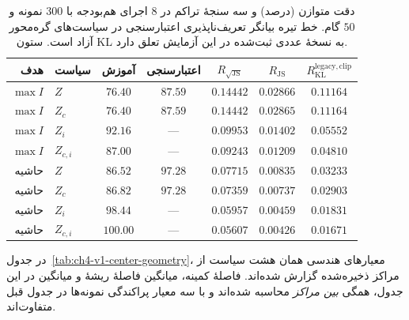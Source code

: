 \begin{table}[htbp]
\centering\footnotesize
\caption{دقت متوازن (درصد) و سه سنجهٔ تراکم در $8$ اجرای هم‌بودجه با $300$ نمونه و $50$ گام. خط تیره بیانگر تعریف‌ناپذیری اعتبارسنجی در سیاست‌های گره‌محور آزاد است. ستون KL به نسخهٔ عددی ثبت‌شده در این آزمایش تعلق دارد.}
\label{tab:ch4-v1-I-margin-main}
\begin{tabular}{rlccccc}\hline
هدف & سیاست & آموزش & اعتبارسنجی & $R_{\sqrt{\mathrm{JS}}}$ & $R_{\mathrm{JS}}$ & $R_{\mathrm{KL}}^{\mathrm{legacy,clip}}$\\\hline
$\max I$ & $Z$ & $76.40$ & $87.59$ & $0.14442$ & $0.02866$ & $0.11164$\\
$\max I$ & $Z_c$ & $76.40$ & $87.59$ & $0.14442$ & $0.02865$ & $0.11164$\\
$\max I$ & $Z_i$ & $92.16$ & --- & $0.09953$ & $0.01402$ & $0.05552$\\
$\max I$ & $Z_{c,i}$ & $87.00$ & --- & $0.09243$ & $0.01209$ & $0.04810$\\
حاشیه & $Z$ & $86.52$ & $97.28$ & $0.07715$ & $0.00835$ & $0.03233$\\
حاشیه & $Z_c$ & $86.82$ & $97.28$ & $0.07359$ & $0.00737$ & $0.02903$\\
حاشیه & $Z_i$ & $98.44$ & --- & $0.05957$ & $0.00459$ & $0.01831$\\
حاشیه & $Z_{c,i}$ & $100.00$ & --- & $0.05607$ & $0.00426$ & $0.01671$\\
\hline
\end{tabular}
\end{table}

در جدول~\ref{tab:ch4-v1-center-geometry}، معیارهای هندسی همان هشت سیاست از مراکز ذخیره‌شده گزارش شده‌اند. فاصلهٔ کمینه، میانگین فاصلهٔ ریشهٔ  و میانگین  در این جدول، همگی \emph{بین مراکز} محاسبه شده‌اند و با سه معیار پراکندگی نمونه‌ها در جدول قبل متفاوت‌اند.

